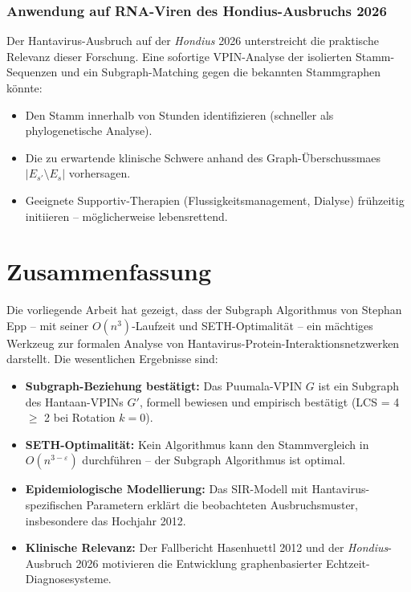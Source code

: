 ﻿\documentclass[a4paper,12pt]{article}
\theoremstyle{definition}
\begin{document}
\subsubsection{Anwendung auf RNA-Viren des Hondius-Ausbruchs 2026}

Der Hantavirus-Ausbruch auf der \emph{Hondius} 2026 \cite{Eurosport2026}
unterstreicht die praktische Relevanz dieser Forschung. Eine sofortige
VPIN-Analyse der isolierten Stamm-Sequenzen und ein Subgraph-Matching
gegen die bekannten Stammgraphen k\"onnte:
\begin{itemize}
    \item Den Stamm innerhalb von Stunden identifizieren (schneller als
          phylogenetische Analyse).
    \item Die zu erwartende klinische Schwere anhand des Graph-\"Uberschussmaes
          $|E_{s'} \setminus E_s|$ vorhersagen.
    \item Geeignete Supportiv-Therapien (Flussigkeitsmanagement, Dialyse)
          fr\"uhzeitig initiieren -- m\"oglicherweise lebensrettend.
\end{itemize}

\section{Zusammenfassung}
\label{sec:zusammenfassung}

Die vorliegende Arbeit hat gezeigt, dass der Subgraph Algorithmus
von Stephan Epp -- mit seiner $O(n^3)$-Laufzeit und SETH-Optimalit\"at --
ein m\"achtiges Werkzeug zur formalen Analyse von Hantavirus-Protein-Interaktionsnetzwerken
darstellt. Die wesentlichen Ergebnisse sind:

\begin{itemize}
    \item \textbf{Subgraph-Beziehung best\"atigt:} Das Puumala-VPIN $G$ ist
          ein Subgraph des Hantaan-VPINs $G'$, formell bewiesen und empirisch
          best\"atigt (LCS = 4 $\geq$ 2 bei Rotation $k=0$).
    \item \textbf{SETH-Optimalit\"at:} Kein Algorithmus kann den Stammvergleich
          in $O(n^{3-\varepsilon})$ durchf\"uhren -- der Subgraph Algorithmus
          ist optimal.
    \item \textbf{Epidemiologische Modellierung:} Das SIR-Modell mit
          Hantavirus-spezifischen Parametern erkl\"art die beobachteten
          Ausbruchsmuster, insbesondere das Hochjahr 2012.
    \item \textbf{Klinische Relevanz:} Der Fallbericht Hasenhuettl 2012
          und der \emph{Hondius}-Ausbruch 2026 motivieren die Entwicklung
          graphenbasierter Echtzeit-Diagnosesysteme.
\end{itemize}
\end{document}
